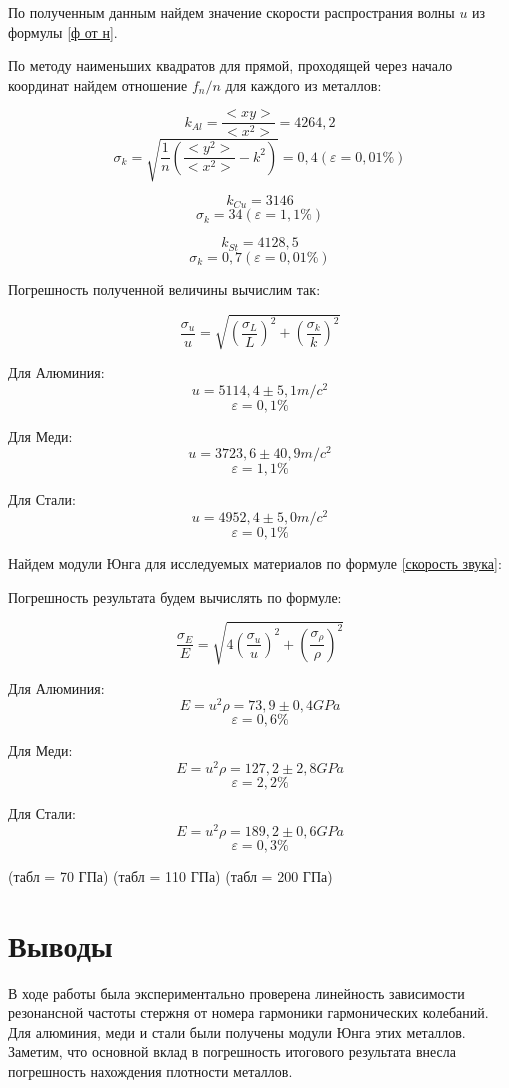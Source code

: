     По полученным данным найдем значение скорости распространия волны $u$ из формулы \eqref{ф от н}.
    
    По методу наименьших квадратов для прямой, проходящей через начало координат найдем отношение $f_n/n$ для каждого из металлов:
    
    
\[k_{Al} = \frac{<xy>}{<x^2>} = 4264,2\]
\[\sigma_k = \sqrt{\frac{1}{n}\left(\frac{<y^2>}{<x^2>}-k^2\right)} = 0,4 (\varepsilon = 0,01\%)\]

\[k_{Cu} = 3146\]
\[\sigma_k = 34  (\varepsilon = 1,1\%)\]

\[k_{St} = 4128,5\]
\[\sigma_k = 0,7  (\varepsilon = 0,01\%)\]
    
    Погрешность полученной величины вычислим так:
    
\[\frac{\sigma_u}{u} = \sqrt{\left(\frac{\sigma_L}{L}\right)^2 + \left(\frac{\sigma_k}{k}\right)^2}\]



Для Алюминия:    
\[u = 5114,4 \pm 5,1 m/c^2\]
\[\varepsilon = 0,1\%\]

Для Меди:    
\[u = 3723,6 \pm 40,9 m/c^2\]
\[\varepsilon = 1,1\%\]

Для Стали:    
\[u = 4952,4 \pm 5,0 m/c^2\]
\[\varepsilon = 0,1\%\]




    Найдем модули Юнга для исследуемых материалов по формуле \eqref{скорость звука}:
    
    Погрешность результата будем вычислять по формуле:
    
\[\frac{\sigma_E}{E} = \sqrt{4\left(\frac{\sigma_u}{u}\right)^2 + \left(\frac{\sigma_{\rho}}{\rho}\right)^2}\]


    
Для Алюминия:    
\[E = u^2\rho = 73,9 \pm 0,4 GPa\]  \[\varepsilon = 0,6\%\]

Для Меди:    
\[E = u^2\rho = 127,2 \pm 2,8 GPa\]  \[\varepsilon = 2,2\%\]

Для Стали:    
\[E = u^2\rho = 189,2 \pm 0,6 GPa\]  \[\varepsilon = 0,3\%\]

(табл = 70 ГПа)
(табл = 110 ГПа)
(табл = 200 ГПа)




\section{Выводы}

    
    В ходе работы была экспериментально проверена линейность зависимости резонансной частоты стержня от номера гармоники гармонических колебаний. Для алюминия, меди и стали были получены модули Юнга этих металлов. Заметим, что основной вклад в погрешность итогового результата внесла погрешность нахождения плотности металлов. 
    
